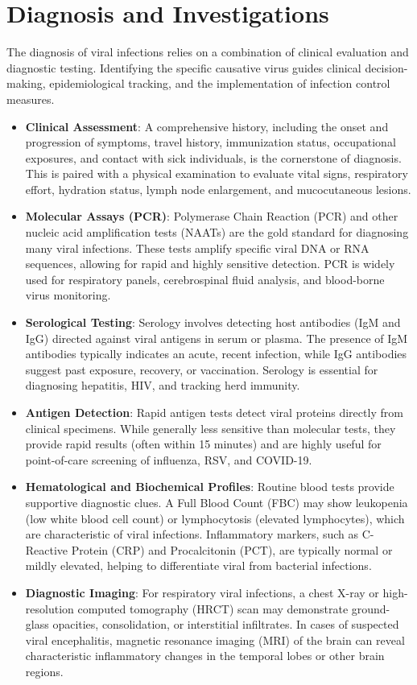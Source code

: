 \section*{Diagnosis and Investigations}
The diagnosis of viral infections relies on a combination of clinical evaluation and diagnostic testing. Identifying the specific causative virus guides clinical decision-making, epidemiological tracking, and the implementation of infection control measures.
\begin{itemize}
    \item \textbf{Clinical Assessment}: A comprehensive history, including the onset and progression of symptoms, travel history, immunization status, occupational exposures, and contact with sick individuals, is the cornerstone of diagnosis. This is paired with a physical examination to evaluate vital signs, respiratory effort, hydration status, lymph node enlargement, and mucocutaneous lesions.
    \item \textbf{Molecular Assays (PCR)}: Polymerase Chain Reaction (PCR) and other nucleic acid amplification tests (NAATs) are the gold standard for diagnosing many viral infections. These tests amplify specific viral DNA or RNA sequences, allowing for rapid and highly sensitive detection. PCR is widely used for respiratory panels, cerebrospinal fluid analysis, and blood-borne virus monitoring.
    \item \textbf{Serological Testing}: Serology involves detecting host antibodies (IgM and IgG) directed against viral antigens in serum or plasma. The presence of IgM antibodies typically indicates an acute, recent infection, while IgG antibodies suggest past exposure, recovery, or vaccination. Serology is essential for diagnosing hepatitis, HIV, and tracking herd immunity.
    \item \textbf{Antigen Detection}: Rapid antigen tests detect viral proteins directly from clinical specimens. While generally less sensitive than molecular tests, they provide rapid results (often within 15 minutes) and are highly useful for point-of-care screening of influenza, RSV, and COVID-19.
    \item \textbf{Hematological and Biochemical Profiles}: Routine blood tests provide supportive diagnostic clues. A Full Blood Count (FBC) may show leukopenia (low white blood cell count) or lymphocytosis (elevated lymphocytes), which are characteristic of viral infections. Inflammatory markers, such as C-Reactive Protein (CRP) and Procalcitonin (PCT), are typically normal or mildly elevated, helping to differentiate viral from bacterial infections.
    \item \textbf{Diagnostic Imaging}: For respiratory viral infections, a chest X-ray or high-resolution computed tomography (HRCT) scan may demonstrate ground-glass opacities, consolidation, or interstitial infiltrates. In cases of suspected viral encephalitis, magnetic resonance imaging (MRI) of the brain can reveal characteristic inflammatory changes in the temporal lobes or other brain regions.
\end{itemize}

